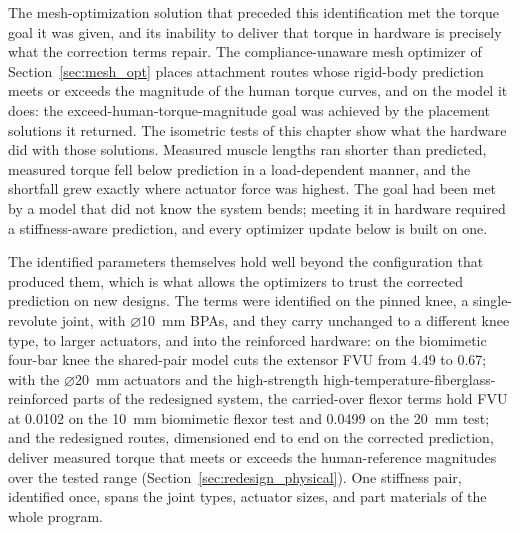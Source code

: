 The mesh-optimization solution that preceded this identification met the torque goal it was given, and its inability to deliver that torque in hardware is precisely what the correction terms repair. The compliance-unaware mesh optimizer of Section~\ref{sec:mesh_opt} places attachment routes whose rigid-body prediction meets or exceeds the magnitude of the human torque curves, and on the model it does: the exceed-human-torque-magnitude goal was achieved by the placement solutions it returned. The isometric tests of this chapter show what the hardware did with those solutions. Measured muscle lengths ran shorter than predicted, measured torque fell below prediction in a load-dependent manner, and the shortfall grew exactly where actuator force was highest. The goal had been met by a model that did not know the system bends; meeting it in hardware required a stiffness-aware prediction, and every optimizer update below is built on one.

The identified parameters themselves hold well beyond the configuration that produced them, which is what allows the optimizers to trust the corrected prediction on new designs. The terms were identified on the pinned knee, a single-revolute joint, with $\diameter$\qty{10}{\mm} BPAs, and they carry unchanged to a different knee type, to larger actuators, and into the reinforced hardware: on the biomimetic four-bar knee the shared-pair model cuts the extensor FVU from 4.49 to 0.67; with the $\diameter$\qty{20}{\mm} actuators and the high-strength high-temperature-fiberglass-reinforced parts of the redesigned system, the carried-over flexor terms hold FVU at 0.0102 on the \qty{10}{\mm} biomimetic flexor test and 0.0499 on the \qty{20}{\mm} test; and the redesigned routes, dimensioned end to end on the corrected prediction, deliver measured torque that meets or exceeds the human-reference magnitudes over the tested range (Section~\ref{sec:redesign_physical}). One stiffness pair, identified once, spans the joint types, actuator sizes, and part materials of the whole program.

